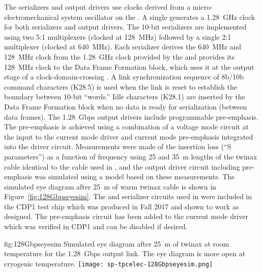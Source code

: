 The serializers and output drivers use clocks derived from a micro-electromechanical
system oscillator on the . A single  generates a 
\SI{1.28}{GHz} clock for both serializers and output drivers. The \num{10}-bit
serializers are implemented using two \num{5}:\num{1} multiplexers (clocked at \SI{128}{MHz}) 
followed by a single \num{2}:\num{1} multiplexer (clocked at \SI{640}{MHz}). Each serializer 
derives the \SI{640}{MHz} and \SI{128}{MHz} clock from the \SI{1.28}{GHz} 
clock provided by the  and provides its \SI{128}{MHz} clock to 
the Data Frame Formation block, which uses it at the output stage of a 
clock-domain-crossing . A link synchronization sequence of 8b/10b 
command characters (K28.5) is used when the link is reset to establish the 
boundary between \num{10}-bit ``words.'' Idle characters (K28.1) are inserted 
by the Data Frame Formation block when no data is ready for serialization 
(between data frames). The \SI{1.28}{Gbps} output drivers include programmable 
pre-emphasis. The pre-emphasis is achieved using a combination of a voltage 
mode circuit at the input to the current mode driver and current mode 
pre-emphasis integrated into the driver circuit. Measurements were made 
of the insertion loss (``S parameters'') as a function of frequency using
\num{25} and \SI{35}{m} lengths of the twinax cable identical to the 
cable used in , and the output driver circuit including 
pre-emphasis was simulated using a  model based on these 
measurements. The simulated eye diagram after \SI{25}{m} of warm twinax 
cable is shown in Figure~\ref{fig:128Gbpseyesim}. The  and 
serializer circuits used in  were included in the CDP1 
test chip which was produced in Fall 2017 and shown to work as designed. 
The pre-emphasis circuit has been added to the current mode driver which 
was verified in CDP1 and can be disabled if desired. 

\begin{dunefigure}
{fig:128Gbpseyesim}
{Simulated eye diagram after \SI{25}{m} of  twinax at room 
temperature for the  \SI{1.28}{Gbps} output link.  
The eye diagram is more open at cryogenic temperature.}
\texttt{[image: sp-tpcelec-128Gbpseyesim.png]}
\end{dunefigure}

\label{sec:fdsp-tpcelec-design-femb-alt-cots}

